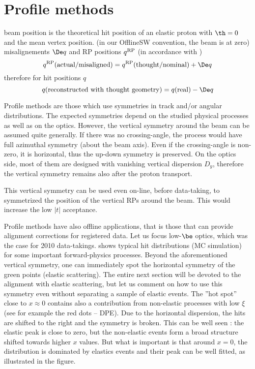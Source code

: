 


\section[al prof]{Profile methods}

\> beam position is the theoretical hit position of an elastic proton with $\th = 0$ and the mean vertex position.
\> (in our OfflineSW convention, the beam is at zero)
\> misalignements $\De q$ and RP positions $q^{\rm RP}$ (in accordance with )
$$q^{\rm RP}(\hbox{actual/misaligned}) = q^{\rm RP}(\hbox{thought/nominal}) + \De q$$
therefore for hit positions $q$
$$q(\hbox{reconstructed with thought geometry}) = q(\hbox{real}) - \De q$$

Profile methods are those which use symmetries in track and/or angular distributions. The expected symmetries depend on the studied physical processes as well as on the optics. However, the vertical symmetry around the beam can be assumed quite generally. If there was no crossing-angle, the process would have full azimuthal symmetry (about the beam axis). Even if the crossing-angle is non-zero, it is horizontal, thus the up-down symmetry is preserved. On the optics side, most of them are designed with vanishing vertical dispersion $D_y$, therefore the vertical symmetry remains also after the proton transport.

This vertical symmetry can be used even on-line, before data-taking, to symmetrized the position of the vertical RPs around the beam. This would increase the low $|t|$ acceptance.

Profile methods have also offline applications, that is those that can provide alignment corrections for registered data. Let us focus low-$\be$ optics, which was the case for 2010 data-takings.  shows typical hit distributions (MC simulation) for some important forward-physics processes. Beyond the aforementioned vertical symmetry, one can immediately spot the horizontal symmetry of the green points (elastic scattering). The entire next section will be devoted to the alignment with elastic scattering, but let us comment on how to use this symmetry even without separating a sample of elastic events. The ''hot spot'' close to $x\approx 0$ contains also a contribution from non-elastic processes with low $\xi$ (see for example the red dots -- DPE). Due to the horizontal dispersion, the hits are shifted to the right and the symmetry is broken. This can be well seen : the elastic peak is close to zero, but the non-elastic events form a broad structure shifted towards higher $x$ values. But what is important is that around $x=0$, the distribution is dominated by elastics events and their peak can be well fitted, as illustrated in the figure.

